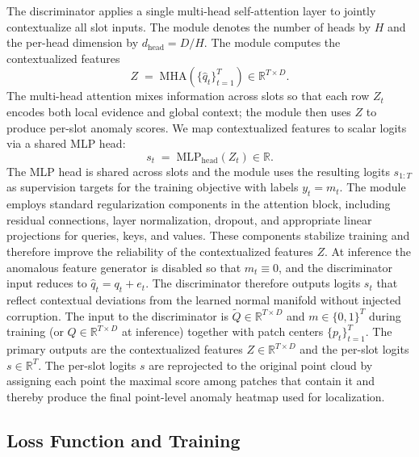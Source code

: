 The discriminator applies a single multi-head self-attention layer to jointly contextualize all slot inputs. The module denotes the number of heads by \(H\) and the per-head dimension by \(d_{\mathrm{head}}=D/H\). The module computes the contextualized features
\begin{equation}
Z \;=\; \mathrm{MHA}(\{\hat{q}_t\}_{t=1}^T) \in\mathbb{R}^{T\times D}.
\end{equation}
The multi-head attention mixes information across slots so that each row \(Z_t\) encodes both local evidence and global context; the module then uses \(Z\) to produce per-slot anomaly scores. We map contextualized features to scalar logits via a shared MLP head:
\begin{equation}
s_t \;=\; \mathrm{MLP}_{\mathrm{head}}(Z_t) \in\mathbb{R}.
\end{equation}
The MLP head is shared across slots and the module uses the resulting logits \(s_{1:T}\) as supervision targets for the training objective with labels \(y_t=m_t\).
The module employs standard regularization components in the attention block, including residual connections, layer normalization, dropout, and appropriate linear projections for queries, keys, and values. These components stabilize training and therefore improve the reliability of the contextualized features \(Z\). At inference the anomalous feature generator is disabled so that \(m_t\equiv 0\), and the discriminator input reduces to \(\hat{q}_t = q_t + e_t\). The discriminator therefore outputs logits \(s_t\) that reflect contextual deviations from the learned normal manifold without injected corruption. The input to the discriminator is \(\tilde{Q}\in\mathbb{R}^{T\times D}\) and \(m\in\{0,1\}^T\) during training (or \(Q\in\mathbb{R}^{T\times D}\) at inference) together with patch centers \(\{p_t\}_{t=1}^T\). The primary outputs are the contextualized features \(Z\in\mathbb{R}^{T\times D}\) and the per-slot logits \(s\in\mathbb{R}^T\). The per-slot logits \(s\) are reprojected to the original point cloud by assigning each point the maximal score among patches that contain it and thereby produce the final point-level anomaly heatmap used for localization.

\subsection{Loss Function and Training}
\label{sec:loss}

